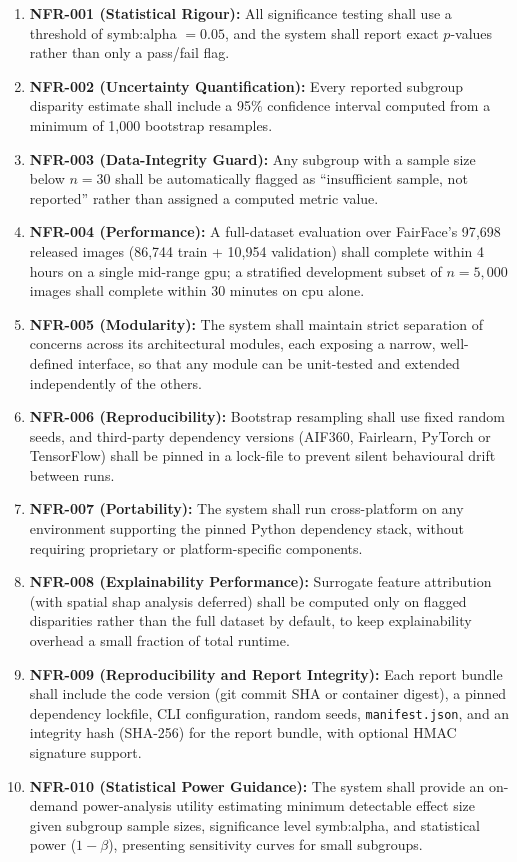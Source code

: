 \begin{enumerate}
    \item \textbf{NFR-001 (Statistical Rigour):} All significance testing shall use a threshold of \gls{symb:alpha} \(= 0.05\), and the system shall report exact \(p\)-values rather than only a pass/fail flag.
    \item \textbf{NFR-002 (Uncertainty Quantification):} Every reported subgroup disparity estimate shall include a 95\% confidence interval computed from a minimum of 1{,}000 bootstrap resamples.
    \item \textbf{NFR-003 (Data-Integrity Guard):} Any subgroup with a sample size below \(n = 30\) shall be automatically flagged as ``insufficient sample, not reported'' rather than assigned a computed metric value.
    \item \textbf{NFR-004 (Performance):} A full-dataset evaluation over FairFace's 97{,}698 released images (86{,}744 train + 10{,}954 validation) shall complete within 4 hours on a single mid-range \gls{gpu}; a stratified development subset of \(n = 5{,}000\) images shall complete within 30 minutes on \gls{cpu} alone.
    \item \textbf{NFR-005 (Modularity):} The system shall maintain strict separation of concerns across its architectural modules, each exposing a narrow, well-defined interface, so that any module can be unit-tested and extended independently of the others.
    \item \textbf{NFR-006 (Reproducibility):} Bootstrap resampling shall use fixed random seeds, and third-party dependency versions (AIF360, Fairlearn, PyTorch or TensorFlow) shall be pinned in a lock-file to prevent silent behavioural drift between runs.
    \item \textbf{NFR-007 (Portability):} The system shall run cross-platform on any environment supporting the pinned Python dependency stack, without requiring proprietary or platform-specific components.
    \item \textbf{NFR-008 (Explainability Performance):} Surrogate feature attribution (with spatial \gls{shap} analysis deferred) shall be computed only on flagged disparities rather than the full dataset by default, to keep explainability overhead a small fraction of total runtime.
    \item \textbf{NFR-009 (Reproducibility and Report Integrity):} Each report bundle shall include the code version (git commit SHA or container digest), a pinned dependency lockfile, CLI configuration, random seeds, \texttt{manifest.json}, and an integrity hash (SHA-256) for the report bundle, with optional HMAC signature support.
    \item \textbf{NFR-010 (Statistical Power Guidance):} The system shall provide an on-demand power-analysis utility estimating minimum detectable effect size given subgroup sample sizes, significance level \gls{symb:alpha}, and statistical power (\(1-\beta\)), presenting sensitivity curves for small subgroups.
\end{enumerate}

